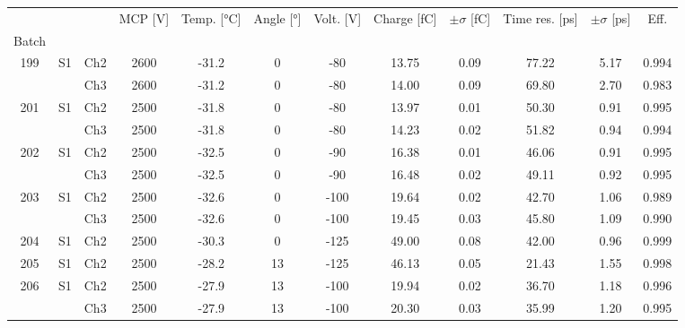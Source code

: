 \begin{tabular}{cccccccccccc}
\toprule
 &  &  & MCP [V] & Temp. [°C] & Angle [°] & Volt. [V] & Charge [fC] & \(\pm\sigma\) [fC] & Time res. [ps] & \(\pm\sigma\) [ps] & Eff. \\
Batch &  &  &  &  &  &  &  &  &  &  &  \\
\midrule
199 & S1 & Ch2 & 2600 & -31.2 & 0 & -80 & 13.75 & 0.09 & 77.22 & 5.17 & 0.994 \\
 &  & Ch3 & 2600 & -31.2 & 0 & -80 & 14.00 & 0.09 & 69.80 & 2.70 & 0.983 \\
201 & S1 & Ch2 & 2500 & -31.8 & 0 & -80 & 13.97 & 0.01 & 50.30 & 0.91 & 0.995 \\
 &  & Ch3 & 2500 & -31.8 & 0 & -80 & 14.23 & 0.02 & 51.82 & 0.94 & 0.994 \\
202 & S1 & Ch2 & 2500 & -32.5 & 0 & -90 & 16.38 & 0.01 & 46.06 & 0.91 & 0.995 \\
 &  & Ch3 & 2500 & -32.5 & 0 & -90 & 16.48 & 0.02 & 49.11 & 0.92 & 0.995 \\
203 & S1 & Ch2 & 2500 & -32.6 & 0 & -100 & 19.64 & 0.02 & 42.70 & 1.06 & 0.989 \\
 &  & Ch3 & 2500 & -32.6 & 0 & -100 & 19.45 & 0.03 & 45.80 & 1.09 & 0.990 \\
204 & S1 & Ch2 & 2500 & -30.3 & 0 & -125 & 49.00 & 0.08 & 42.00 & 0.96 & 0.999 \\
205 & S1 & Ch2 & 2500 & -28.2 & 13 & -125 & 46.13 & 0.05 & 21.43 & 1.55 & 0.998 \\
206 & S1 & Ch2 & 2500 & -27.9 & 13 & -100 & 19.94 & 0.02 & 36.70 & 1.18 & 0.996 \\
 &  & Ch3 & 2500 & -27.9 & 13 & -100 & 20.30 & 0.03 & 35.99 & 1.20 & 0.995 \\
\bottomrule
\end{tabular}
